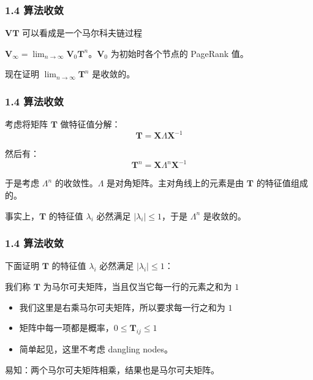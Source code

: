 \documentclass{beamer}
\begin{document}
\begin{frame}
	\frametitle{1.4 算法收敛}

	\(\mathbf{V}\mathbf{T}\) 可以看成是一个马尔科夫链过程
	
	\pause
	
	\(\mathbf{V}_{\infty} = \lim_{n\to\infty}\mathbf{V}_0\mathbf{T}^n\)。\(\mathbf{V}_{0}\) 为初始时各个节点的 PageRank 值。
	
	\pause

	现在证明 \(\lim_{n\rightarrow \infty} \mathbf{T}^n\) 是收敛的。
	
\end{frame}

\begin{frame}
	\frametitle{1.4 算法收敛}
	考虑将矩阵 \(\mathbf{T}\) 做特征值分解：
	\[
	\mathbf{T}=\mathbf{X}\Lambda \mathbf{X}^{-1}
	\]

	\pause

	然后有：
	\[
	\mathbf{T}^n = \mathbf{X}\Lambda^n \mathbf{X}^{-1}
	\]

	\pause

	于是考虑 \(\Lambda^n\) 的收敛性。\(\Lambda\) 是对角矩阵。主对角线上的元素是由 \(\mathbf{T}\) 的特征值组成的。
	
	\pause

	事实上，\(\mathbf{T}\) 的特征值 \(\lambda_i\) 必然满足 \(|\lambda_i|\le 1\)，于是 \(\Lambda^n\) 是收敛的。
\end{frame}

\begin{frame}
	\frametitle{1.4 算法收敛}
	下面证明 \(\mathbf{T}\) 的特征值 \(\lambda_i\) 必然满足 \(|\lambda_i|\le 1\)：
	
	\pause

	我们称 \(\mathbf{T}\) 为马尔可夫矩阵，当且仅当它每一行的元素之和为 \(1\)
	
	\pause

	\begin{itemize}
		\item 我们这里是右乘马尔可夫矩阵，所以要求每一行之和为 \(1\) \pause
		\item 矩阵中每一项都是概率，\(0\le \mathbf{T}_{ij} \le 1\) \pause
		\item 简单起见，这里不考虑 dangling nodes。
	\end{itemize}

	\pause

	易知：两个马尔可夫矩阵相乘，结果也是马尔可夫矩阵。
\end{frame}
\end{document}
